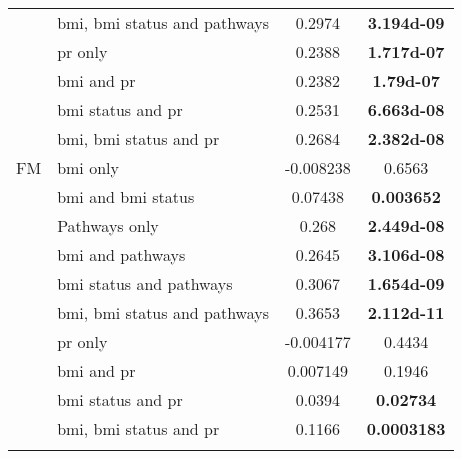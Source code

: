 \begin{ThreePartTable}
\begin{longtable}{llcc}
                                          & \gls{bmi}, \gls{bmi} status and pathways & 0.2974     & \bfseries \num{3.194d-09}           \\
                                          & \gls{pr} only                            & 0.2388     & \bfseries \num{1.717d-07}           \\
                                          & \gls{bmi} and \gls{pr}                   & 0.2382     & \bfseries \num{1.79d-07}            \\
                                          & \gls{bmi} status and \gls{pr}            & 0.2531     & \bfseries \num{6.663d-08}           \\
                                          & \gls{bmi}, \gls{bmi} status and \gls{pr} & 0.2684     & \bfseries \num{2.382d-08}           \\
				\hline
				\rule{0pt}{2.25ex}FM      & \gls{bmi} only                           & -0.008238  & 0.6563                              \\
                                          & \gls{bmi} and \gls{bmi} status           & 0.07438    & \bfseries 0.003652                  \\
                                          & Pathways only                            & 0.268      & \bfseries \num{2.449d-08}           \\
                                          & \gls{bmi} and pathways                   & 0.2645     & \bfseries \num{3.106d-08}           \\
                                          & \gls{bmi} status and pathways            & 0.3067     & \bfseries \num{1.654d-09}           \\
                                          & \gls{bmi}, \gls{bmi} status and pathways & 0.3653     & \bfseries \num{2.112d-11}           \\
                                          & \gls{pr} only                            & -0.004177  & 0.4434                              \\
                                          & \gls{bmi} and \gls{pr}                   & 0.007149   & 0.1946                              \\
                                          & \gls{bmi} status and \gls{pr}            & 0.0394     & \bfseries 0.02734                   \\
                                          & \gls{bmi}, \gls{bmi} status and \gls{pr} & 0.1166     & \bfseries 0.0003183                 \\
				\hline
				\hline
				\insertTableNotes
			\end{longtable}
		
	\end{ThreePartTable}

